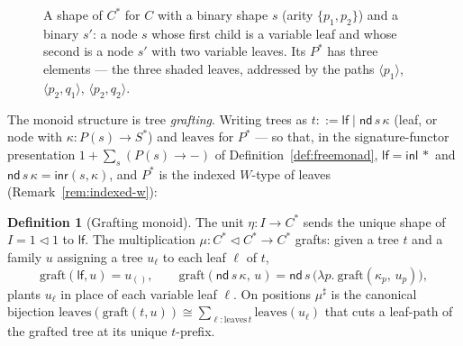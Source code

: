 \documentclass[11pt,a4paper]{book}
\newcommand{\cont}[2]{#1 \triangleleft #2}
\theoremstyle{plain}
\theoremstyle{definition}
\newtheorem{Definition}[Theorem]{Definition}
\theoremstyle{remark}
\begin{document}
\begin{figure}[h]\centering
{}
\caption{A shape of $C^{*}$ for $C$ with a binary shape $s$ (arity $\{p_1,p_2\}$) and a
binary $s'$: a node $s$ whose first child is a variable leaf and whose second is a node $s'$
with two variable leaves. Its $P^{*}$ has three elements --- the three shaded leaves,
addressed by the paths $\langle p_1\rangle$, $\langle p_2,q_1\rangle$,
$\langle p_2,q_2\rangle$.}\label{fig:freetree}
\end{figure}

The monoid structure is tree \emph{grafting}. Writing trees as $t::=\mathsf{lf}\mid
\mathsf{nd}\,s\,\kappa$ (leaf, or node with $\kappa\colon P(s)\to S^{*}$) and
$\mathrm{leaves}$ for $P^{*}$ --- so that, in the signature-functor presentation
$1+\sum_{s}(P(s)\to-)$ of Definition~\ref{def:freemonad}, $\mathsf{lf}=\mathsf{inl}\,\ast$
and $\mathsf{nd}\,s\,\kappa=\mathsf{inr}(s,\kappa)$, and $P^{*}$ is the indexed
$W$-type of leaves (Remark~\ref{rem:indexed-w}):

\begin{Definition}[Grafting monoid]\label{def:grafting}
The unit $\eta\colon I\to C^{*}$ sends the unique shape of $I=\cont 11$ to $\mathsf{lf}$. The
multiplication $\mu\colon C^{*}\triangleleft C^{*}\to C^{*}$ grafts: given a tree $t$ and a
family $u$ assigning a tree $u_{\ell}$ to each leaf $\ell$ of $t$,
\[
  \mathrm{graft}(\mathsf{lf},u)=u_{()},\qquad
  \mathrm{graft}(\mathsf{nd}\,s\,\kappa,\,u)=\mathsf{nd}\,s\,\bigl(\lambda p.\
    \mathrm{graft}(\kappa_{p},\,u_{p})\bigr),
\]
plants $u_{\ell}$ in place of each variable leaf $\ell$. On positions $\mu^{\sharp}$ is the
canonical bijection
$\mathrm{leaves}(\mathrm{graft}(t,u))\cong\sum_{\ell:\mathrm{leaves}\,t}\mathrm{leaves}(u_{\ell})$
that cuts a leaf-path of the grafted tree at its unique $t$-prefix.
\end{Definition}
\end{document}
